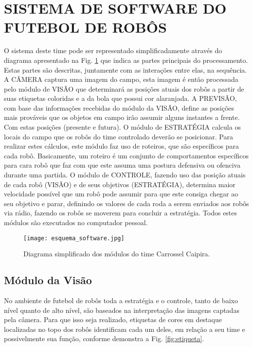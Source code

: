 \section{SISTEMA DE SOFTWARE DO FUTEBOL DE ROBÔS}

O sistema deste time pode ser representado simplificadamente através do diagrama apresentado na Fig. \ref{fig:esquema_software} que indica as partes principais do processamento. Estas partes são descritas, juntamente com as interações entre elas, na sequência. A CÂMERA captura uma imagem do campo, esta imagem é então processada pelo módulo de VISÃO que determinará as posições atuais dos robôs a partir de suas etiquetas coloridas e a da bola que possui cor alaranjada. A PREVISÃO, com base das informações recebidas do módulo da VISÃO, define as posições mais prováveis que os objetos em campo irão assumir alguns instantes a frente. Com estas posições (presente e futura). O módulo de ESTRATÉGIA calcula os locais do campo que os robôs do time controlado deverão se posicionar. Para realizar estes cálculos, este módulo faz uso de roteiros, que são específicos para cada robô. Basicamente, um roteiro é um conjunto de comportamentos específicos para cara robô que faz com que este assuma uma postura defensiva ou ofenciva durante uma partida. O módulo de CONTROLE, fazendo uso das posição atuais de cada robô (VISÃO) e de seus objetivos (ESTRATÉGIA), determina maior velocidade possível que um robô pode assumir para que este consiga chegar ao seu objetivo e parar, definindo os valores de cada roda a serem enviados aos robôs via rádio, fazendo os robôs se moverem para concluir a estratégia. Todos estes módulos são executados no computador pessoal.

\begin{figure}[!htb]
  \centering
  \texttt{[image: esquema\_software.jpg]}
  \caption{Diagrama simplificado dos módulos do time Carrossel Caipira.}
  \label{fig:esquema_software}
\end{figure}

\subsection{Módulo da Visão}

No ambiente de futebol de robôs toda a estratégia e o controle, tanto de baixo nível quanto de alto nível, são baseados na interpretação das imagens captadas pela câmera. Para que isso seja realizado, etiquetas de cores em destaque localizadas no topo dos robôs identificam cada um deles, em relação a seu time e possivelmente sua função, conforme demonstra a Fig. \ref{fig:etiqueta}.


